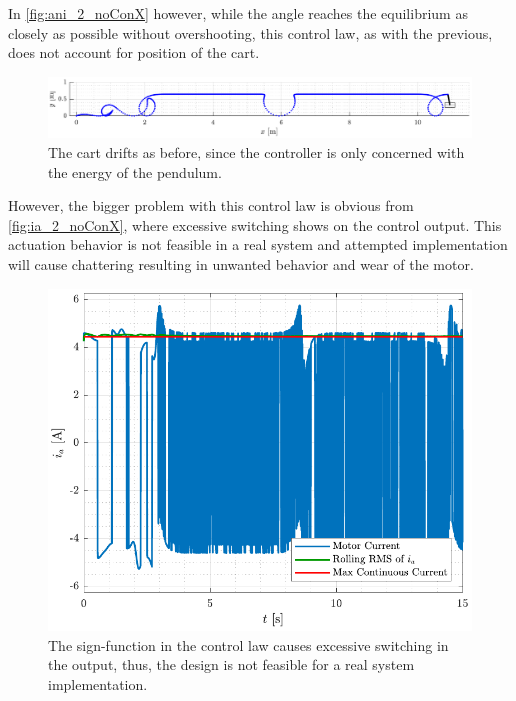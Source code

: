 %
In \autoref{fig:ani_2_noConX} however, while the angle reaches the equilibrium as closely as possible without overshooting, this control law, as with the previous, does not account for position of the cart.
%
\begin{figure}[H]
  \includegraphics[width=1\textwidth]{figures/ani_2_noConX}
  \caption{The cart drifts as before, since the controller is only concerned with the energy of the pendulum.}
  \label{fig:ani_2_noConX}
\end{figure}
%
However, the bigger problem with this control law is obvious from \autoref{fig:ia_2_noConX}, where excessive switching shows on the control output. This actuation behavior is not feasible in a real system and attempted implementation will cause chattering resulting in unwanted behavior and wear of the motor.
%
\begin{figure}[H]
  \includegraphics[width=.52\textwidth]{figures/ia_2_noConX}
  \caption{The sign-function in the control law causes excessive switching in the output, thus, the design is not feasible for a real system implementation.}
  \label{fig:ia_2_noConX}
\end{figure}
%
